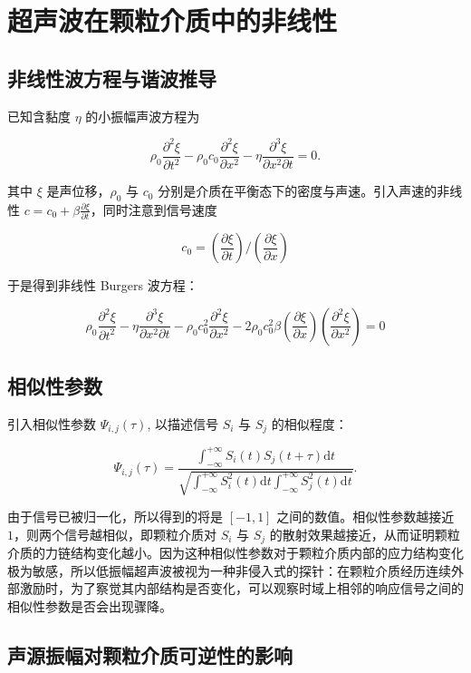 \section{超声波在颗粒介质中的非线性}

\subsection{非线性波方程与谐波推导}

已知含黏度 $\eta$ 的小振幅声波方程为

\begin{equation}
  \rho_{0}\frac{\partial^{2}\xi}{\partial t^{2}} - \rho_{0}c_{0}\frac{\partial^{2}\xi}{\partial x^{2}} - \eta\frac{\partial^{3}\xi}{\partial x^{2}\partial t} = 0.
\end{equation}

其中 $\xi$ 是声位移，$\rho_{0}$ 与 $c_{0}$ 分别是介质在平衡态下的密度与声速。引入声速的非线性 $c = c_{0} + \beta\frac{\partial\xi}{\partial t}$，同时注意到信号速度

\begin{equation}
  c_{0} = \left(\frac{\partial \xi}{\partial t}\right)/\left(\frac{\partial\xi}{\partial x}\right)
\end{equation}

于是得到非线性 Burgers 波方程：


\begin{equation}
  \rho_{0}\frac{\partial^{2}\xi}{\partial t^{2}} - \eta\frac{\partial^{3}\xi}{\partial x^{2}\partial t} - \rho_{0}c_{0}^{2}\frac{\partial^{2}\xi}{\partial x^{2}} - 2\rho_{0}c_{0}^{2}\beta\left(\frac{\partial \xi}{\partial x}\right)\left(\frac{\partial^{2} \xi}{\partial x^{2}}\right) = 0
\end{equation}



\subsection{相似性参数}

引入相似性参数 $\Psi_{i,j}(\tau)$, 以描述信号 $S_{i}$ 与 $S_{j}$ 的相似程度\cite{PhysRevLett.90.174302}：

\begin{equation}
  \Psi_{i,j}(\tau) = \frac{\int_{-\infty}^{+\infty}S_{i}(t)S_{j}(t+\tau)\mathrm{d}t}{\sqrt{\int_{-\infty}^{+\infty}S_{i}^{2}(t)\mathrm{d}t\int_{-\infty}^{+\infty}S_{j}^{2}(t)\mathrm{d}t}}.
\end{equation}

由于信号已被归一化，所以得到的将是 $[-1,1]$ 之间的数值。相似性参数越接近 $1$，则两个信号越相似，即颗粒介质对 $S_{i}$ 与 $S_{j}$ 的散射效果越接近，从而证明颗粒介质的力链结构变化越小。因为这种相似性参数对于颗粒介质内部的应力结构变化极为敏感，所以低振幅超声波被视为一种非侵入式的探针：在颗粒介质经历连续外部激励时，为了察觉其内部结构是否变化，可以观察时域上相邻的响应信号之间的相似性参数是否会出现骤降。

\subsection{声源振幅对颗粒介质可逆性的影响}